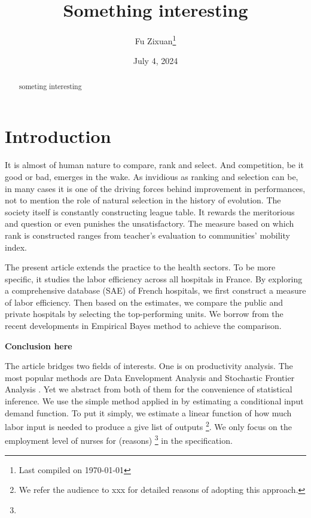 \documentclass[12pt]{article}
\title{Something interesting}
\author{Fu Zixuan\thanks{Last compiled on \today}}
\date{July 4, 2024}
\begin{document}
\maketitle

\begin{abstract}
    \noindent  someting interesting\\


    \bigskip
\end{abstract}

\newpage
\tableofcontents
\newpage

\section{Introduction}

It is almost of human nature to compare, rank and select. And competition, be
it good or bad, emerges in the wake. As invidious as ranking and selection can
be, in many cases it is one of the driving forces behind improvement in
performances, not to mention the role of natural selection in the history of
evolution. The society itself is constantly constructing league table. It
rewards the meritorious and question or even punishes the unsatisfactory. The
measure based on which rank is constructed ranges from teacher's evaluation to
communities' mobility index.

The present article extends the practice to the health sectors. To be more
specific, it studies the labor efficiency across all hospitals in France. By
exploring a comprehensive database (SAE) of French hospitals, we first
construct a measure of labor efficiency. Then based on the estimates, we
compare the public and private hospitals by selecting the top-performing units.
We borrow from the recent developments in Empirical Bayes method to achieve the
comparison.

\textbf{Conclusion here}

The article bridges two fields of interests. One is on productivity analysis.
The most popular methods are Data Envelopment Analysis
\cite{charnes1978measuring} and Stochastic Frontier Analysis
\cite{aigner1977formulation,meeusen1977efficiency}. Yet we abstract from both
of them for the convenience of statistical inference. We use the simple method
applied in \cite{croiset2024hospitals} by estimating a conditional input demand
function. To put it simply, we estimate a linear function of how much labor
input is needed to produce a give list of outputs \footnote{We refer the
    audience to xxx for detailed reasons of adopting this approach.}. We only focus
on the employment level of nurses for (reasons) \footnote{} in the
specification.
\end{document}
